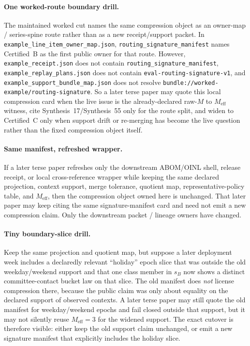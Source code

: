 \documentclass[11pt]{article}
\begin{document}
\paragraph{One worked-route boundary drill.}
The maintained worked cut names the same compression object as an owner-map / series-spine route rather than as a new receipt/support packet. In \nolinkurl{example_line_item_owner_map.json}, \nolinkurl{routing_signature_manifest} names Certified~B as the first public owner for that route. However, \nolinkurl{example_receipt.json} does not contain \nolinkurl{routing_signature_manifest}, \nolinkurl{example_replay_plans.json} does not contain \nolinkurl{eval-routing-signature-v1}, and \nolinkurl{example_support_bundle_map.json} does not resolve \nolinkurl{bundle://worked-example/routing-signature}. So a later terse paper may quote this local compression card when the live issue is the already-declared raw-$M$ to $M_{\mathrm{eff}}$ witness, cite Synthesis~17/Synthesis~55 only for the route split, and widen to Certified~C only when support drift or re-merging has become the live question rather than the fixed compression object itself.\cite{series:workedexample,series:seriesspines,series:recert}

\paragraph{Same manifest, refreshed wrapper.}
If a later terse paper refreshes only the downstream ABOM/OINL shell, release receipt, or local cross-reference wrapper while keeping the same declared projection, context support, merge tolerance, quotient map, representative-policy table, and $M_{\mathrm{eff}}$, then the compression object owned here is unchanged.
That later paper may keep citing the same signature-manifest card and need not emit a new compression claim.
Only the downstream packet / lineage owners have changed.\cite{series:abomoinl,series:releaseA,series:workedexample,series:seriesspines}

\paragraph{Tiny boundary-slice drill.}
Keep the same projection and quotient map, but suppose a later deployment week includes a declaredly relevant ``holiday'' epoch slice that was outside the old weekday/weekend support and that one class member in $s_B$ now shows a distinct committee-contact bucket law on that slice.
The old manifest does \emph{not} license compression there, because the public claim was only about equality on the declared support of observed contexts.
A later terse paper may still quote the old manifest for weekday/weekend epochs and fail closed outside that support, but it may not silently reuse $M_{\mathrm{eff}}=3$ for the widened support.
The exact cutover is therefore visible: either keep the old support claim unchanged, or emit a new signature manifest that explicitly includes the holiday slice.
\end{document}
